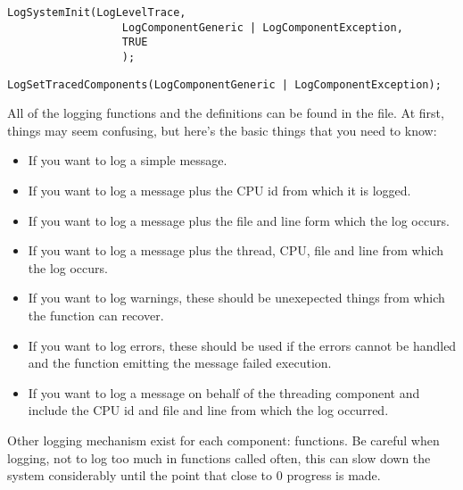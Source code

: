 \begin{appendices}
\begin{lstlisting}[caption={Logging Init},label={lst:LoggingInit}]
    LogSystemInit(LogLevelTrace,
                  LogComponentGeneric | LogComponentException,
                  TRUE
                  );
\end{lstlisting}

\begin{lstlisting}[caption={Logging Change},label={lst:LoggingChange}]
	LogSetTracedComponents(LogComponentGeneric | LogComponentException);
\end{lstlisting}

All of the logging functions and the definitions can be found in the  file. At first,
things may seem confusing, but here's the basic things that you need to know:

\begin{itemize}
	\item {} If you want to log a simple message.

	\item {} If you want to log a message plus the CPU id from which it is logged.

	\item {} If you want to log a message plus the file and line form which the log
occurs.

	\item {} If you want to log a message plus the thread, CPU, file and line from which
the log occurs.

	\item {} If you want to log warnings, these should be unexepected
things from which the function can recover.

	\item {} If you want to log errors, these should be used if the errors cannot be
handled and the function emitting the message failed execution.

	\item {} If you want to log a message on behalf of the threading
component and include the CPU id and file and line from which the log occurred.
\end{itemize}

Other logging mechanism exist for each component:  functions. Be careful when
logging, not to log too much in functions called often, this can slow down the system considerably
until the point that close to 0 progress is made.


\end{appendices}

